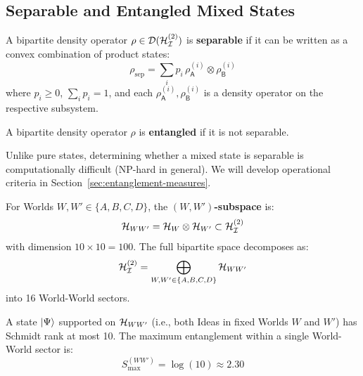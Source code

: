 \subsection{Separable and Entangled Mixed States}

\begin{definition}
\label{def:separable-mixed}
A bipartite density operator $\rho \in \mathcal{D}(\mathcal{H}_{\mathcal{I}}^{(2)})$ is \textbf{separable} if it can be written as a convex combination of product states:
\[
\rho_{\mathrm{sep}} = \sum_i p_i \, \rho_\mathsf{A}^{(i)} \otimes \rho_\mathsf{B}^{(i)}
\]
where $p_i \geq 0$, $\sum_i p_i = 1$, and each $\rho_\mathsf{A}^{(i)}, \rho_\mathsf{B}^{(i)}$ is a density operator on the respective subsystem.
\end{definition}

\begin{definition}
\label{def:entangled-mixed}
A bipartite density operator $\rho$ is \textbf{entangled} if it is not separable.
\end{definition}

\begin{remark}
\label{rem:separability-hard}
Unlike pure states, determining whether a mixed state is separable is computationally difficult (NP-hard in general). We will develop operational criteria in Section~\ref{sec:entanglement-measures}.
\end{remark}

\begin{definition}
\label{def:world-world-subspace}
For Worlds $W, W' \in \{A, B, C, D\}$, the \textbf{$(W, W')$-subspace} is:
\[
\mathcal{H}_{WW'} = \mathcal{H}_W \otimes \mathcal{H}_{W'} \subset \mathcal{H}_{\mathcal{I}}^{(2)}
\]
with dimension $10 \times 10 = 100$. The full bipartite space decomposes as:
\[
\mathcal{H}_{\mathcal{I}}^{(2)} = \bigoplus_{W, W' \in \{A,B,C,D\}} \mathcal{H}_{WW'}
\]
into 16 World-World sectors.
\end{definition}

\begin{proposition}
\label{prop:world-localized}
A state $|\Psi\rangle$ supported on $\mathcal{H}_{WW'}$ (i.e., both Ideas in fixed Worlds $W$ and $W'$) has Schmidt rank at most 10. The maximum entanglement within a single World-World sector is:
\[
S_{\max}^{(WW')} = \log(10) \approx 2.30
\]
\end{proposition}

